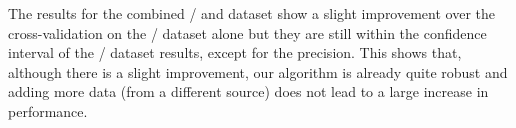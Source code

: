 \begin{subappendices}
The results for the combined / and  dataset show a slight improvement over the cross-validation on the / dataset alone but they are still within the confidence interval of the / dataset results, except for the precision.
This shows that, although there is a slight improvement, our algorithm is already quite robust and adding more data (from a different source) does not lead to a large increase in performance.


\end{subappendices}
